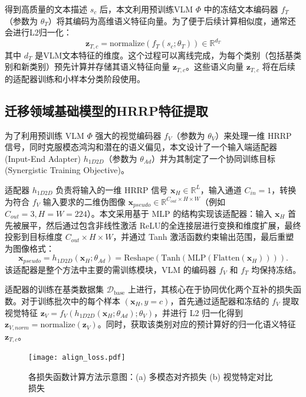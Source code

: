 得到高质量的文本描述 $s_c$ 后，本文利用预训练VLM $\Phi$ 中的冻结文本编码器 $f_T$（参数为 $\theta_T$）将其编码为高维语义特征向量。为了便于后续计算相似度，通常还会进行L2归一化：
\begin{equation}
    \mathbf{z}_{T,c} = \text{normalize}(f_T(s_c; \theta_T)) \in \mathbb{R}^{d_T}
    \label{eq:semantic_encoding}
\end{equation}
其中 $d_T$ 是VLM文本特征的维度。这个过程可以离线完成，为每个类别（包括基类别和新类别）预先计算并存储其语义特征向量 $\mathbf{z}_{T,c}$。这些语义向量 $\mathbf{z}_{T,c}$ 将在后续的适配器训练和小样本分类阶段使用。

\subsection{迁移领域基础模型的HRRP特征提取}
\label{subsec:hrrp_feature_vlm}

为了利用预训练 VLM $\Phi$ 强大的视觉编码器 $f_V$（参数为 $\theta_V$）来处理一维 HRRP 信号，同时克服模态鸿沟和潜在的语义偏见，本文设计了一个输入端适配器 (Input-End Adapter) $h_{1D2D}$（参数为 $\theta_{Ad}$）并为其制定了一个协同训练目标 (Synergistic Training Objective)。

适配器 $h_{1D2D}$ 负责将输入的一维 HRRP 信号 $\mathbf{x}_H \in \mathbb{R}^{L}$，输入通道 $C_{in}=1$，转换为符合 $f_V$ 输入要求的二维伪图像 $\mathbf{x}_{pseudo} \in \mathbb{R}^{C_{out} \times H \times W}$（例如 $C_{out}=3, H=W=224$）。本文采用基于 MLP 的结构实现该适配器：输入 $\mathbf{x}_H$ 首先被展平，然后通过包含非线性激活 ReLU的全连接层进行变换和维度扩展，最终投影到目标维度 $C_{out} \times H \times W$，并通过 Tanh 激活函数约束输出范围，最后重塑为图像格式：
\begin{equation} \mathbf{x}_{pseudo} = h_{1D2D}(\mathbf{x}_H; \theta_{Ad}) = \text{Reshape}(\text{Tanh}(\text{MLP}(\text{Flatten}(\mathbf{x}_H)))). \label{eq:adapter_1d2d} \end{equation}
该适配器是整个方法中主要的需训练模块，VLM 的编码器 $f_V$ 和 $f_T$ 均保持冻结。

适配器的训练在基类数据集 $\mathcal{D}_{\text{base}}$ 上进行，其核心在于协同优化两个互补的损失函数。对于训练批次中的每个样本 $(\mathbf{x}_H, y=c)$，首先通过适配器和冻结的 $f_V$ 提取视觉特征 $\mathbf{z}_V = f_V(h_{1D2D}(\mathbf{x}_H; \theta_{Ad}); \theta_V)$，并进行 L2 归一化得到 $\mathbf{z}_{V, norm} = \text{normalize}(\mathbf{z}_V)$。同时，获取该类别对应的预计算好的归一化语义特征 $\mathbf{z}_{T,c}$。

\begin{figure}[h!] \centering %
\texttt{[image: align\_loss.pdf]}
\caption{各损失函数计算方法示意图：(a) 多模态对齐损失 (b) 视觉特定对比损失} \label{fig:align} %
\end{figure}

